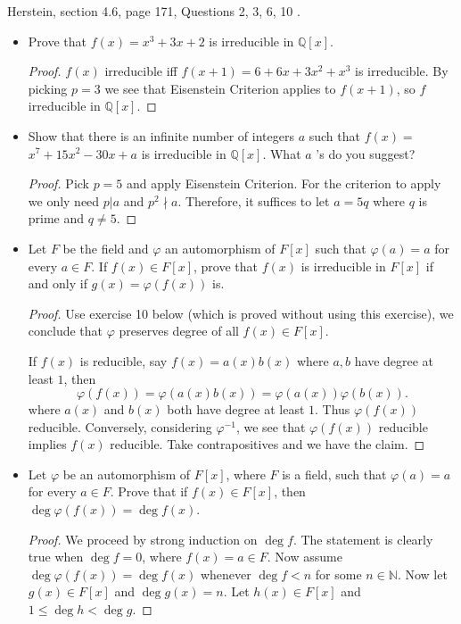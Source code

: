 Herstein, section 4.6, page 171, Questions 2, 3, 6, 10 .
\begin{itemize}
	\item [2.] Prove that $f(x)=x^3+3 x+2$ is irreducible in $\mathbb{Q}[x]$.
\begin{proof}
	$f(x)$ irreducible iff $f(x+1) = 6 + 6 x + 3 x^2 + x^3$ is irreducible. By picking  $p = 3$  we see that Eisenstein Criterion applies to  $f(x+1)$, so $f$ irreducible in $\mathbb{Q}[x]$.
\end{proof}

	\item [3.] Show that there is an infinite number of integers $a$ such that $f(x)=$ $x^7+15 x^2-30 x+a$ is irreducible in $\mathbb{Q}[x]$. What $a$ 's do you suggest?
\begin{proof}
	Pick $p = 5$ and apply Eisenstein Criterion. For the criterion to apply we only need $p | a$ and $p^2 \nmid a$. 
	Therefore, it suffices to let $a = 5q$ where $q$ is prime and $q \neq  5$.
\end{proof}

\item [6.] Let $F$ be the field and $\varphi$ an automorphism of $F[x]$ such that $\varphi(a)=a$ for every $a \in F$. If $f(x) \in F[x]$, prove that $f(x)$ is irreducible in $F[x]$ if and only if $g(x)=\varphi(f(x))$ is.
\begin{proof}
	Use exercise 10 below (which is proved without using this exercise), we conclude that $\varphi$ preserves degree of all $f(x) \in F[x]$.

	If $f(x)$ is reducible, say $f(x) = a(x)b(x)$ where $a,b $ have degree at least $1$, then 
	\[
		\varphi(f(x)) = \varphi(a(x)b(x)) = \varphi(a(x))\varphi(b(x))
	.\] 
	where $a(x)$ and $b(x)$ both have degree at least $1$. Thus $\varphi(f(x))$ reducible. Conversely, considering $\varphi^{-1} $, we see that $\varphi(f(x))$ reducible implies $f(x)$ reducible. Take contrapositives and we have the claim.
\end{proof}

\item [10.] Let $\varphi$ be an automorphism of $F[x]$, where $F$ is a field, such that $\varphi(a)=a$ for every $a \in F$. Prove that if $f(x) \in F[x]$, then $\operatorname{deg} \varphi(f(x))=\operatorname{deg} f(x)$.
\begin{proof}
	We proceed by strong induction on $\operatorname{deg} f$. The statement is clearly true when $\operatorname{deg} f = 0$, where $f(x) = a \in F$. Now assume $\operatorname{deg} \varphi(f(x)) = \operatorname{deg} f(x)$ whenever $\operatorname{deg} f < n$ for some $n \in \mathbb{N}$. Now let $g(x) \in F[x]$ and $\operatorname{deg}  g(x) = n$. Let $h(x) \in F[x]$ and $1 \le \operatorname{deg} h < \operatorname{deg} g$. 


\end{proof}
\end{itemize}
